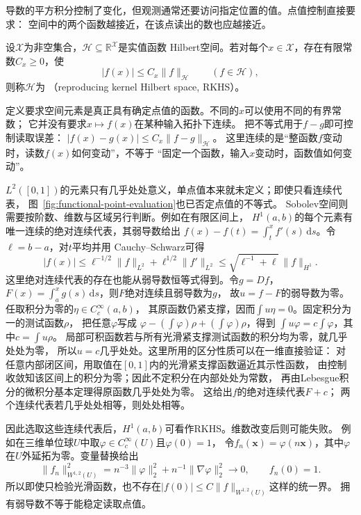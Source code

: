 导数的平方积分控制了变化，但观测通常还要访问指定位置的值。点值控制直接要求：
空间中的两个函数越接近，在该点读出的数也应越接近。
\begin{definition}[再生核Hilbert空间]
\label{def:functional-rkhs}
设$\mathcal X$为非空集合，$\mathcal H\subseteq\mathbb R^{\mathcal X}$是实值函数
Hilbert空间。若对每个$x\in\mathcal X$，存在有限常数$C_x\geq0$，使
\[
 |f(x)|\leq C_x\lVert f\rVert_{\mathcal H}\qquad(f\in\mathcal H),
\]
则称$\mathcal H$为
（reproducing kernel Hilbert space, RKHS）。
\end{definition}
定义要求空间元素是真正具有确定点值的函数。不同的$x$可以使用不同的有界常数；
它并没有要求$x\mapsto f(x)$在某种输入拓扑下连续。
把不等式用于$f-g$即可控制读取误差：
$|f(x)-g(x)|\leq C_x\lVert f-g\rVert_{\mathcal H}$。
这里连续的是“整函数$f$变动时，读数$f(x)$如何变动”，不等于
“固定一个函数，输入$x$变动时，函数值如何变动”。

$L^2([0,1])$的元素只有几乎处处意义，单点值本来就未定义；即使只看连续代表，
图~\ref{fig:functional-point-evaluation}也已否定点值的不等式。
Sobolev空间则需要按阶数、维数与区域另行判断。例如在有限区间上，
$H^1(a,b)$的每个元素有唯一连续的绝对连续代表，其弱导数给出
$f(x)-f(t)=\int_t^x f'(s)\,\mathrm ds$。令$\ell=b-a$，对$t$平均并用
Cauchy--Schwarz可得
\[
 |f(x)|\leq \ell^{-1/2}\lVert f\rVert_{L^2}
              +\ell^{1/2}\lVert f'\rVert_{L^2}
 \leq\sqrt{\ell^{-1}+\ell}\,\lVert f\rVert_{H^1}.
\]
这里绝对连续代表的存在也能从弱导数恒等式得到。令$g=Df$，
$F(x)=\int_a^x g(s)\,\mathrm ds$，则$F$绝对连续且弱导数为$g$，
故$u=f-F$的弱导数为零。任取积分为零的$\eta\in C_c^\infty(a,b)$，
其原函数仍紧支撑，因而$\int u\eta=0$。固定积分为一的测试函数$\rho$，
把任意$\varphi$写成
$\varphi-(\int\varphi)\rho+(\int\varphi)\rho$，得到
$\int u\varphi=c\int\varphi$，其中$c=\int u\rho$。
局部可积函数若与所有光滑紧支撑测试函数的积分均为零，就几乎处处为零，
所以$u=c$几乎处处。这里所用的区分性质可以在一维直接验证：
对任意内部闭区间，用取值在$[0,1]$内的光滑紧支撑函数逼近其示性函数，
由控制收敛知该区间上的积分为零；因此不定积分在内部处处为常数，
再由Lebesgue积分的微积分基本定理得原函数几乎处处为零。
这给出$f$的绝对连续代表$F+c$；
两个连续代表若几乎处处相等，则处处相等。

因此选取这些连续代表后，$H^1(a,b)$可看作RKHS。维数改变后则可能失败。
例如在三维单位球$U$中取$\varphi\in C_c^\infty(U)$且$\varphi(0)=1$，
令$f_n(\bm x)=\varphi(n\bm x)$，其中$\varphi$在$U$外延拓为零。变量替换给出
\[
 \lVert f_n\rVert_{W^{1,2}(U)}^2
 =n^{-3}\lVert\varphi\rVert_2^2+
   n^{-1}\lVert\nabla\varphi\rVert_2^2\longrightarrow0,
 \qquad f_n(0)=1.
\]
所以即使只检验光滑函数，也不存在$|f(0)|\leq C\lVert f\rVert_{W^{1,2}(U)}$这样的统一界。
拥有弱导数不等于能稳定读取点值。

